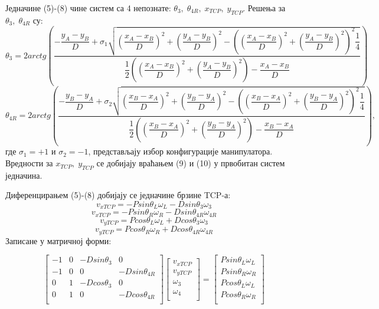 \documentclass[12pt]{article}
\begin{document}
Једначине (5)-(8) чине систем са 4 непознате: $\theta_3,\;\theta_{4R},\;x_{TCP},\;y_{TCP}$. Решења за $\theta_3,\;\theta_{4R}$ су:
\begin{equation}
    \theta_3 = 2arctg\left(\dfrac{-\dfrac{y_A - y_B}{D} + \sigma_1\sqrt{\left(\dfrac{x_A-x_B}{D}\right)^2+\left(\dfrac{y_A-y_B}{D}\right)^2-\left(\left(\dfrac{x_A-x_B}{D}\right)^2+\left(\dfrac{y_A-y_B}{D}\right)^2\right)^2\dfrac{1}{4}}}{\dfrac{1}{2}\left(\left(\dfrac{x_A-x_B}{D}\right)^2+\left(\dfrac{y_A-y_B}{D}\right)^2\right)-\dfrac{x_A-x_B}{D}}\right)
\end{equation}
\begin{equation}
    \theta_{4R} = 2arctg\left(\dfrac{-\dfrac{y_B - y_A}{D} + \sigma_2\sqrt{\left(\dfrac{x_B-x_A}{D}\right)^2+\left(\dfrac{y_B-y_A}{D}\right)^2-\left(\left(\dfrac{x_B-x_A}{D}\right)^2+\left(\dfrac{y_B-y_A}{D}\right)^2\right)^2\dfrac{1}{4}}}{\dfrac{1}{2}\left(\left(\dfrac{x_B-x_A}{D}\right)^2+\left(\dfrac{y_B-y_A}{D}\right)^2\right)-\dfrac{x_B-x_A}{D}}\right),
\end{equation}
где $\sigma_1=+1$ и $\sigma_2=-1$, представљају избор конфигурације манипулатора. Вредности за $x_{TCP},\;y_{TCP}$ се добијају враћањем (9) и (10) у првобитан систем једначина.

Диференцирањем (5)-(8) добијају се једначине брзине TCP-а:
\begin{equation}
    v_{xTCP} = -Psin\theta_L\omega_L - Dsin\theta_3\omega_3
\end{equation}
\begin{equation}
    v_{xTCP} = -Psin\theta_R\omega_R - Dsin\theta_{4R}\omega_{4R}
\end{equation}
\begin{equation}
    v_{yTCP} = Pcos\theta_L\omega_L + Dcos\theta_3\omega_3
\end{equation}
\begin{equation}
    v_{yTCP} = Pcos\theta_R\omega_R + Dcos\theta_{4R}\omega_{4R}
\end{equation}
Записане у матричној форми:

\begin{equation}
\begin{bmatrix}
-1 & 0 & -Dsin\theta_3 & 0\\
-1 & 0 & 0 & -Dsin\theta_{4R}\\
0 & 1 & -Dcos\theta_3 & 0\\
0 & 1 & 0 & -Dcos\theta_{4R}\\
\end{bmatrix}
\begin{bmatrix}
v_{xTCP}\\
v_{yTCP}\\
\omega_3\\
\omega_4\\
\end{bmatrix}
=
\begin{bmatrix}
Psin\theta_L\omega_L\\
Psin\theta_R\omega_R\\
Pcos\theta_L\omega_L\\
Pcos\theta_R\omega_R\\
\end{bmatrix}
\end{equation}
\end{document}
